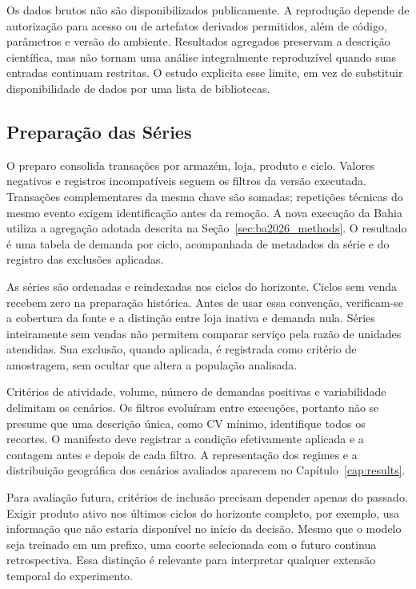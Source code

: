 Os dados brutos não são disponibilizados publicamente. A reprodução depende de autorização para acesso ou de artefatos derivados permitidos, além de código, parâmetros e versão do ambiente. Resultados agregados preservam a descrição científica, mas não tornam uma análise integralmente reproduzível quando suas entradas continuam restritas. O estudo explicita esse limite, em vez de substituir disponibilidade de dados por uma lista de bibliotecas.

\subsection{Preparação das Séries}
\label{sec:pipeline_experimental}

O preparo consolida transações por armazém, loja, produto e ciclo. Valores negativos e registros incompatíveis seguem os filtros da versão executada. Transações complementares da mesma chave são somadas; repetições técnicas do mesmo evento exigem identificação antes da remoção. A nova execução da Bahia utiliza a agregação adotada descrita na Seção~\ref{sec:ba2026_methods}. O resultado é uma tabela de demanda por ciclo, acompanhada de metadados da série e do registro das exclusões aplicadas.

As séries são ordenadas e reindexadas nos ciclos do horizonte. Ciclos sem venda recebem zero na preparação histórica. Antes de usar essa convenção, verificam-se a cobertura da fonte e a distinção entre loja inativa e demanda nula. Séries inteiramente sem vendas não permitem comparar serviço pela razão de unidades atendidas. Sua exclusão, quando aplicada, é registrada como critério de amostragem, sem ocultar que altera a população analisada.

Critérios de atividade, volume, número de demandas positivas e variabilidade delimitam os cenários. Os filtros evoluíram entre execuções, portanto não se presume que uma descrição única, como CV mínimo, identifique todos os recortes. O manifesto deve registrar a condição efetivamente aplicada e a contagem antes e depois de cada filtro. A representação dos regimes e a distribuição geográfica dos cenários avaliados aparecem no Capítulo~\ref{cap:results}.

Para avaliação futura, critérios de inclusão precisam depender apenas do passado. Exigir produto ativo nos últimos ciclos do horizonte completo, por exemplo, usa informação que não estaria disponível no início da decisão. Mesmo que o modelo seja treinado em um prefixo, uma coorte selecionada com o futuro continua retrospectiva. Essa distinção é relevante para interpretar qualquer extensão temporal do experimento.

